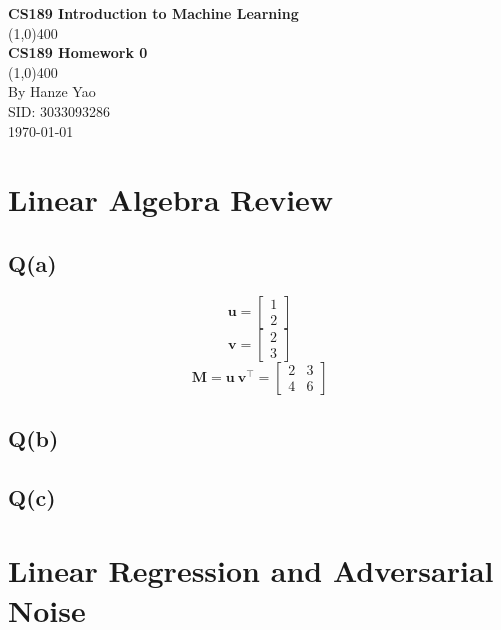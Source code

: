 \documentclass[11pt]{article}
\begin{document}
\begin{titlepage}
\begin{center}
\vspace*{1cm}
\Large{\textbf{CS189 Introduction to Machine Learning}}\\
\vfill
\line(1,0){400}\\[1mm]
\huge{\textbf{CS189 Homework 0}}\\[1mm]
\line(1,0){400}\\
\vfill
\Large{By Hanze Yao}\\
\Large{SID: 3033093286}\\
\today\\
\end{center}
\end{titlepage}

\tableofcontents
\thispagestyle{empty}
\clearpage

\setcounter{page}{1}

\section{Linear Algebra Review}

\subsection{Q(a)}
\[
\mathbf{u}=
  \begin{bmatrix}
    1  \\
    2
  \end{bmatrix}
\]
\[
\mathbf{v}=
  \begin{bmatrix}
    2 \\
    3
  \end{bmatrix}
\]
\[
\mathbf{M}=\mathbf{u\ v^\top}=
  \begin{bmatrix}
    2 & 3 \\
    4 & 6
  \end{bmatrix}
\]



\subsection{Q(b)}

\subsection{Q(c)}

\pagebreak
\section{Linear Regression and Adversarial Noise}
\end{document}
